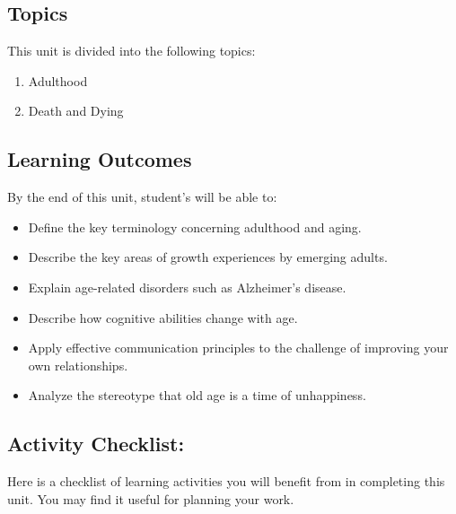 \documentclass[
]{book}
\providecommand{\tightlist}{%
  \setlength{\itemsep}{0pt}\setlength{\parskip}{0pt}}
\begin{document}
\hypertarget{topics-3}{%
\subsection*{Topics}\label{topics-3}}

This unit is divided into the following topics:

\begin{enumerate}
\def\labelenumi{\arabic{enumi}.}
\tightlist
\item
  Adulthood\\
\item
  Death and Dying
\end{enumerate}

\hypertarget{learning-outcomes-3}{%
\subsection*{Learning Outcomes}\label{learning-outcomes-3}}

By the end of this unit, student's will be able to:

\begin{itemize}
\tightlist
\item
  Define the key terminology concerning adulthood and aging.\\
\item
  Describe the key areas of growth experiences by emerging adults.
\item
  Explain age-related disorders such as Alzheimer's disease.\\
\item
  Describe how cognitive abilities change with age.\\
\item
  Apply effective communication principles to the challenge of improving your own relationships.\\
\item
  Analyze the stereotype that old age is a time of unhappiness.
\end{itemize}

\hypertarget{activity-checklist-3}{%
\subsection*{Activity Checklist:}\label{activity-checklist-3}}

Here is a checklist of learning activities you will benefit from in completing this unit. You may find it useful for planning your work.
\end{document}
